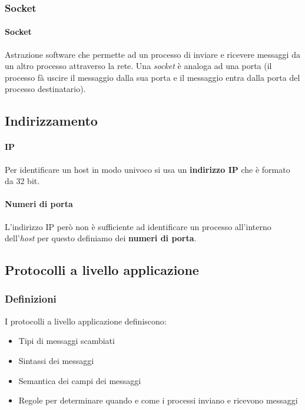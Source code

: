         \subsubsection{Socket}
            \paragraph{Socket} Astrazione software che permette ad un processo di inviare e ricevere messaggi da un altro processo attraverso la rete.\newline
            Una \textit{socket} è analoga ad una porta (il processo fà uscire il messaggio dalla sua porta e il messaggio entra dalla porta del processo destinatario).

    \subsection{Indirizzamento}
        \paragraph{\Acrshort*{IP}} Per identificare un host in modo univoco si usa un \textbf{indirizzo \Acrshort*{IP}} che è formato da 32 bit. 

        \paragraph{Numeri di porta} L'indirizzo \Acrshort*{IP} però non è sufficiente ad identificare un processo all'interno dell'\textit{host} per questo definiamo dei \textbf{numeri di porta}.

    \subsection{Protocolli a livello applicazione}
        \subsubsection{Definizioni}
            I protocolli a livello applicazione definiscono:
                \begin{itemize}
                    \item Tipi di messaggi scambiati
                    \item Sintassi dei messaggi
                    \item Semantica dei campi dei messaggi
                    \item Regole per determinare quando e come i processi inviano e ricevono messaggi
                \end{itemize}
